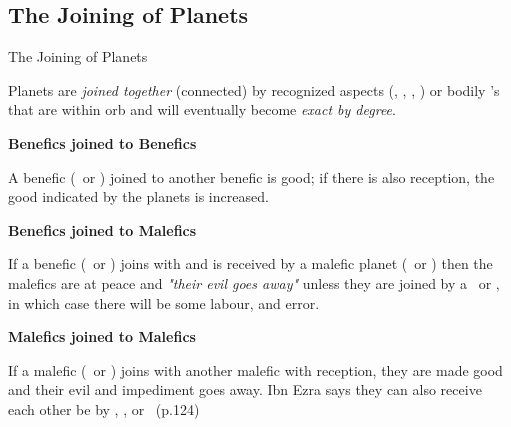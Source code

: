 \subsection{The Joining of Planets}
\begin{frame}[t]{The Joining of Planets}
\begin{block}{}
 Planets are \textsl{joined together} (connected) by recognized aspects (\Sextile, \Square, \Trine, \Opposition) or bodily \Conjunction's that are within orb and will eventually become \textsl{exact by degree}.
 \end{block}
\textbf{Benefics joined to Benefics}\footnotemark[1]

A benefic (\Venus\ or \Jupiter) joined to another benefic is good; if there is also reception, the good indicated by the planets is increased.

\textbf{Benefics joined to Malefics}

If a benefic (\Venus\ or \Jupiter) joins with and is received by a malefic planet (\Mars\ or \Saturn) then the malefics are at peace and \textsl{"their evil goes away"} unless they are joined by a \Square\ or \Opposition, in which case there will be some labour, and error.

\textbf{Malefics joined to Malefics}

If a malefic (\Mars\ or \Saturn) joins with another malefic with reception, they are made good and their evil and impediment goes away. Ibn Ezra says they can also receive each other be by \Conjunction, \Sextile, or \Trine\ (p.124)
\vspace{0.5cm}

\end{frame}
